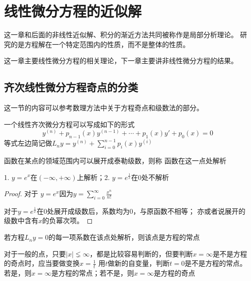 \chapter{线性微分方程的近似解}
这一章和后面的非线性近似解、积分的渐近方法共同被称作是局部分析理论。
研究的是方程解在一个特定范围内的性质，而不是整体的性质。

这一章主要线性微分方程的相关理论，下一章主要讲非线性微分方程的结果。
\section{齐次线性微分方程奇点的分类}

这一节的内容可以参考数理方法中关于方程奇点和级数法的部分。

一个线性齐次微分方程可以写成如下的形式
$$y^{(n)}+p_{n-1}(x)y^{(n-1)}+\cdots +p_{1}(x)y'+p_0(x)=0$$
等式左边简记做$L_ny=y^{(n)}+\sum_{i=0}^{n-1}p_i(x)y^{(i)}$
\begin{definition}
    函数在某点的领域范围内可以展开成泰勒级数，则称
    函数在这一点处解析
\end{definition}
\begin{example}

    1. $y=e^x$在$(-\infty,+\infty)$上解析；2. $y=e^{\frac{1}{x}}$在0处不解析
\end{example}
\begin{proof}
    对于 $y=e^x$因为$y=\sum_{i=0}^{\infty}\frac{x^n}{n!}$

    对于$y=e^{\frac{1}{x}}$在0处展开成级数后，系数均为0，与原函数不相等；
    亦或者说展开的级数中含有$x$的负幂次项。
\end{proof}

\begin{definition}
    若方程$L_ny=0$的每一项系数在该点处解析，则该点是方程的常点
\end{definition}

对于一般的点，只要$|x|\lneq \infty$，都是比较容易判断的，但要判断$x=\infty$是不是方程的奇点时，应当要做变换$x=\frac{1}{t}$
用$t$做新的自变量，判断$t=0$是不是方程的常点。若是，则$x=\infty$是方程的常点；若不是，则$x=\infty$是方程的奇点

